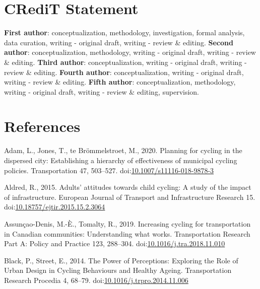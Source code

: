 \documentclass[]{elsarticle} %
\begin{document}
\hypertarget{sec:credit}{%
\section{CRediT Statement}\label{sec:credit}}

\textbf{First author}: conceptualization, methodology, investigation,
formal analysis, data curation, writing - original draft, writing -
review \& editing. \textbf{Second author}: conceptualization,
methodology, writing - original draft, writing - review \& editing.
\textbf{Third author}: conceptualization, writing - original draft,
writing - review \& editing. \textbf{Fourth author}: conceptualization,
writing - original draft, writing - review \& editing. \textbf{Fifth
author}: conceptualization, methodology, writing - original draft,
writing - review \& editing, supervision.

\hypertarget{sec:references}{%
\section*{References}\label{sec:references}}

\hypertarget{refs}{}
\leavevmode\hypertarget{ref-adamPlanningCyclingDispersed2020}{}%
Adam, L., Jones, T., te Brömmelstroet, M., 2020. Planning for cycling in
the dispersed city: Establishing a hierarchy of effectiveness of
municipal cycling policies. Transportation 47, 503--527.
doi:\href{https://doi.org/10.1007/s11116-018-9878-3}{10.1007/s11116-018-9878-3}

\leavevmode\hypertarget{ref-aldredAdultsAttitudesChild2015}{}%
Aldred, R., 2015. Adults' attitudes towards child cycling: A study of
the impact of infrastructure. European Journal of Transport and
Infrastructure Research 15.
doi:\href{https://doi.org/10.18757/ejtir.2015.15.2.3064}{10.18757/ejtir.2015.15.2.3064}

\leavevmode\hypertarget{ref-assuncao-denisIncreasingCyclingTransportation2019a}{}%
Assunçao-Denis, M.-È., Tomalty, R., 2019. Increasing cycling for
transportation in Canadian communities: Understanding what works.
Transportation Research Part A: Policy and Practice 123, 288--304.
doi:\href{https://doi.org/10.1016/j.tra.2018.11.010}{10.1016/j.tra.2018.11.010}

\leavevmode\hypertarget{ref-blackPowerPerceptionsExploring2014a}{}%
Black, P., Street, E., 2014. The Power of Perceptions: Exploring the
Role of Urban Design in Cycling Behaviours and Healthy Ageing.
Transportation Research Procedia 4, 68--79.
doi:\href{https://doi.org/10.1016/j.trpro.2014.11.006}{10.1016/j.trpro.2014.11.006}
\end{document}
